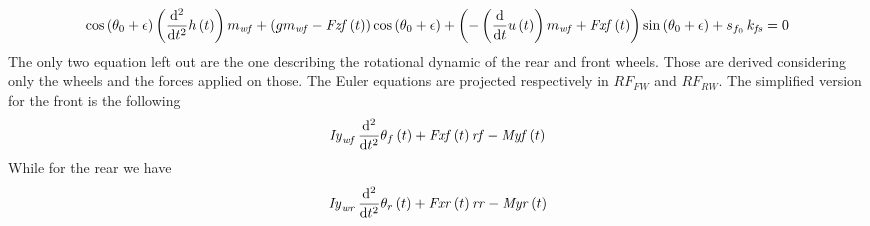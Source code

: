 \begin{equation}
\cos \left( \theta_{0}+\epsilon \right) \left( {\frac {{\rm d}^{2}}{{\rm d}{t}^{2}}}h \left( t \right) \right) m_{{\it wf}}+ \left( gm_{{\it wf}}-{\it Fzf} \left( t\right)  \right) \cos \left( \theta_{0}+\epsilon \right) + \left( -\left( {\frac {\rm d}{{\rm d}t}}u \left( t \right)  \right) m_{{\it wf}}+{\it Fxf} \left( t \right)  \right) \sin \left( \theta_{0}+\epsilon \right) +s_{f_{0}}\,k_{{\it fs}} = 0
\end{equation}
\normalsize
%
The only two equation left out are the one describing the rotational dynamic of the rear and front wheels. Those are derived considering only the wheels and the forces applied on those. The Euler equations are projected respectively in $RF_{FW}$ and $RF_{RW}$. The simplified version for the front is the following
%
\begin{equation}
    {\it Iy}_{{\it wf}}\,{\frac {{\rm d}^{2}}{{\rm d}{t}^{2}}}\theta_{f}
    \left( t \right) +{\it Fxf} \left( t \right) {\it rf}-{\it Myf}
    \left( t \right)    
\end{equation}
%
While for the rear we have
%
\begin{equation}
    {\it Iy}_{{\it wr}}\,{\frac {{\rm d}^{2}}{{\rm d}{t}^{2}}}\theta_{r}
    \left( t \right) +{\it Fxr} \left( t \right) {\it rr}-{\it Myr}
    \left( t \right)        
\end{equation}
%
